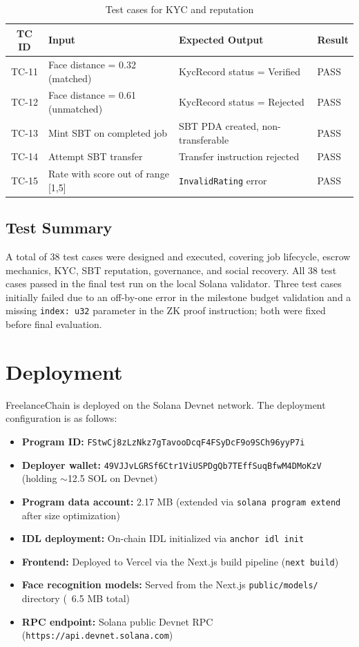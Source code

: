 \begin{table}[H]
\centering
\caption{Test cases for KYC and reputation}
\label{table:tc_kyc}
\begin{tabular}{|c|p{4cm}|p{4cm}|p{3cm}|}
\hline
\textbf{TC ID} & \textbf{Input} & \textbf{Expected Output} & \textbf{Result} \\ \hline
TC-11 & Face distance = 0.32 (matched) & KycRecord status = Verified & PASS \\ \hline
TC-12 & Face distance = 0.61 (unmatched) & KycRecord status = Rejected & PASS \\ \hline
TC-13 & Mint SBT on completed job & SBT PDA created, non-transferable & PASS \\ \hline
TC-14 & Attempt SBT transfer & Transfer instruction rejected & PASS \\ \hline
TC-15 & Rate with score out of range [1,5] & \texttt{InvalidRating} error & PASS \\ \hline
\end{tabular}
\end{table}

\subsection{Test Summary}

A total of 38 test cases were designed and executed, covering job lifecycle, escrow mechanics, KYC, SBT reputation, governance, and social recovery. All 38 test cases passed in the final test run on the local Solana validator. Three test cases initially failed due to an off-by-one error in the milestone budget validation and a missing \texttt{index: u32} parameter in the ZK proof instruction; both were fixed before final evaluation.

\section{Deployment}
\label{section:4.5}

FreelanceChain is deployed on the Solana Devnet network. The deployment configuration is as follows:

\begin{itemize}
    \item \textbf{Program ID:} \texttt{FStwCj8zLzNkz7gTavooDcqF4FSyDcF9o9SCh96yyP7i}
    \item \textbf{Deployer wallet:} \texttt{49VJJvLGRSf6Ctr1ViUSPDgQb7TEffSuqBfwM4DMoKzV} (holding $\sim$12.5 SOL on Devnet)
    \item \textbf{Program data account:} 2.17 MB (extended via \texttt{solana program extend} after size optimization)
    \item \textbf{IDL deployment:} On-chain IDL initialized via \texttt{anchor idl init}
    \item \textbf{Frontend:} Deployed to Vercel via the Next.js build pipeline (\texttt{next build})
    \item \textbf{Face recognition models:} Served from the Next.js \texttt{public/models/} directory (~6.5 MB total)
    \item \textbf{RPC endpoint:} Solana public Devnet RPC (\texttt{https://api.devnet.solana.com})
\end{itemize}

